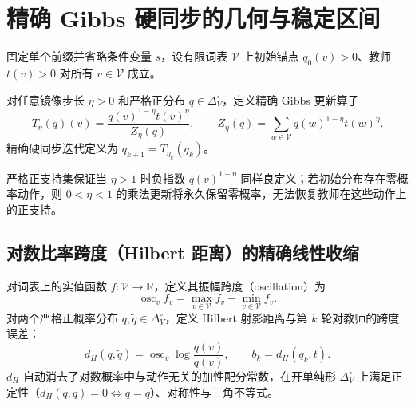 \documentclass[lang=cn,scheme=chinese,openany]{elegantbook}
\newcommand{\R}{\mathbb R}
\begin{document}
\section{精确 Gibbs 硬同步的几何与稳定区间}
\label{dyn:sec:hard-sync-geometry}

固定单个前缀并省略条件变量 $s$，设有限词表 $\mathcal V$ 上初始锚点 $q_0(v)>0$、教师 $t(v)>0$ 对所有 $v\in\mathcal V$ 成立。

\begin{definition}
对任意镜像步长 $\eta>0$ 和严格正分布 $q\in\Delta_V^\circ$，定义精确 Gibbs 更新算子
\begin{equation*}
 T_\eta(q)(v)
 =\frac{q(v)^{1-\eta}t(v)^\eta}{Z_\eta(q)},
 \qquad
 Z_\eta(q)=\sum_{w\in\mathcal V}q(w)^{1-\eta}t(w)^\eta.
\end{equation*}
精确硬同步迭代定义为 $q_{k+1}=T_{\eta_k}(q_k)$。
\end{definition}

严格正支持集保证当 $\eta>1$ 时负指数 $q(v)^{1-\eta}$ 同样良定义；若初始分布存在零概率动作，则 $0<\eta<1$ 的乘法更新将永久保留零概率，无法恢复教师在这些动作上的正支持。

\subsection{对数比率跨度（Hilbert 距离）的精确线性收缩}

\begin{definition}
对词表上的实值函数 $f:\mathcal V\to\R$，定义其振幅跨度（oscillation）为
\begin{equation*}
 \operatorname{osc}_v f_v=\max_{v\in\mathcal V} f_v-\min_{v\in\mathcal V} f_v.
\end{equation*}
对两个严格正概率分布 $q,\widetilde q\in\Delta_V^\circ$，定义 Hilbert 射影距离与第 $k$ 轮对教师的跨度误差：
\begin{equation*}
 d_H(q,\widetilde q)
 =\operatorname{osc}_v\log\frac{q(v)}{\widetilde q(v)},
 \qquad b_k=d_H(q_k,t).
\end{equation*}
$d_H$ 自动消去了对数概率中与动作无关的加性配分常数，在开单纯形 $\Delta_V^\circ$ 上满足正定性（$d_H(q,\widetilde q)=0\Longleftrightarrow q=\widetilde q$）、对称性与三角不等式。
\end{definition}
\end{document}
